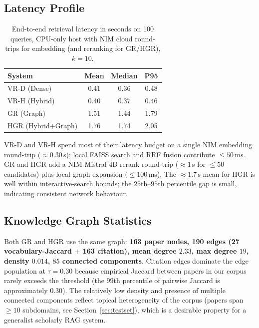 \documentclass[journal]{IEEEtran}
\begin{document}
\subsection{Latency Profile}

\begin{table}[!t]
\centering
\caption{End-to-end retrieval latency in seconds on 100 queries,
CPU-only host with NIM cloud round-trips for embedding (and reranking
for GR/HGR), $k=10$.}
\label{tab:latency}
\setlength{\tabcolsep}{6pt}
\begin{tabular}{lccc}
\toprule
\textbf{System} & \textbf{Mean} & \textbf{Median} & \textbf{P95} \\
\midrule
VR-D (Dense)         & 0.41 & 0.36 & 0.48 \\
VR-H (Hybrid)        & 0.40 & 0.37 & 0.46 \\
GR (Graph)           & 1.51 & 1.44 & 1.79 \\
HGR (Hybrid$+$Graph) & 1.76 & 1.74 & 2.05 \\
\bottomrule
\end{tabular}
\end{table}

VR-D and VR-H spend most of their latency budget on a single NIM
embedding round-trip ($\approx 0.30$\,s); local FAISS search and
RRF fusion contribute $\leq 50$\,ms. GR and HGR add a NIM Mistral-4B
rerank round-trip ($\approx 1$\,s for $\leq 50$ candidates) plus
local graph expansion ($\leq 100$\,ms). The $\approx 1.7$\,s mean for
HGR is well within interactive-search bounds; the $25$th--$95$th
percentile gap is small, indicating consistent network behaviour.

\subsection{Knowledge Graph Statistics}

Both GR and HGR use the same graph: \textbf{163 paper nodes, 190
edges (27 vocabulary-Jaccard $+$ 163 citation), mean degree $2.33$,
max degree $19$, density $0.014$, $85$ connected components}.
Citation edges dominate the edge population at $\tau = 0.30$ because
empirical Jaccard between papers in our corpus rarely exceeds the
threshold (the 99th percentile of pairwise Jaccard is approximately
$0.30$). The relatively low density and presence of multiple
connected components reflect topical heterogeneity of the corpus
(papers span $\geq 10$ subdomains, see Section~\ref{sec:testset}),
which is a desirable property for a generalist scholarly RAG system.
\end{document}
